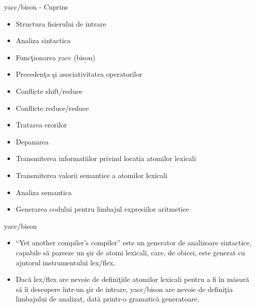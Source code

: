 \documentclass[pdf]{beamer}
\begin{document}
\begin{frame}{yacc/bison - Cuprins}
\begin{itemize}
\item
Structura fisierului de intrare

\item
Analiza sintactica

\item
Funcţionarea yacc (bison)

\item
Precedenţa şi asociativitatea operatorilor

\item
Conflicte shift/reduce

\item
Conflicte reduce/reduce

\item
Tratarea erorilor

\item
Depanarea

\item
Transmiterea informatiilor privind locatia atomilor lexicali

\item
Transmiterea valorii semantice a atomilor lexicali

\item
Analiza semantica

\item
Generarea codului pentru limbajul expresiilor aritmetice

\end{itemize}
\end{frame}



\begin{frame}{yacc/bison}
\begin{itemize}
	\item
	“Yet another compiler’s compiler” este un generator de analizoare sintactice, capabile să parseze un şir de atomi lexicali, care, de obicei, este generat cu ajutorul instrumentului lex/flex.

	\item
	Dacă lex/flex are nevoie de definiţiile atomilor lexicali pentru a fi în măsură să îi descopere într-un şir de intrare, yacc/bison are nevoie de definiţia limbajului de analizat, dată printr-o gramatică generatoare.
\end{itemize}
\end{frame}
\end{document}
